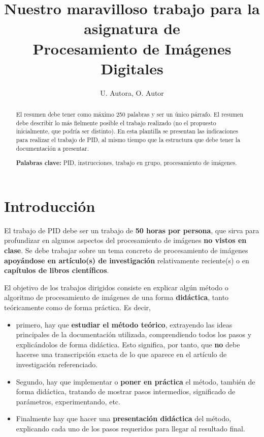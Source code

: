 \documentclass[a4paper]{article}
\title{Nuestro maravilloso trabajo para la asignatura de\\
Procesamiento de Imágenes Digitales}
\author{U. Autora, O. Autor}
\begin{document}
\maketitle

\begin{abstract}
 \noindent El resumen debe tener como máximo 250 palabras y ser un único párrafo. El resumen debe describir lo más fielmente posible el trabajo realizado (no el propuesto inicialmente, que podría ser distinto). 
 En esta plantilla se presentan las indicaciones para realizar el trabajo de PID, al mismo tiempo que la estructura que debe tener la documentación a presentar. 

\hspace{1cm}

\noindent \textbf{Palabras clave:} 
PID, instrucciones, trabajo en grupo, procesamiento de imágenes.
\end{abstract}


\section{Introducción}

El trabajo de PID debe ser un trabajo de {\bf 50 horas por persona}, que sirva para profundizar en algunos aspectos del procesamiento de imágenes {\bf no vistos en clase}. Se debe trabajar sobre un tema concreto de procesamiento de imágenes {\bf apoyándose en artículo(s) de investigación} relativamente reciente(s) o en {\bf capítulos de libros científicos}.

El objetivo de los trabajos dirigidos consiste en explicar algún método o algoritmo de procesamiento de imágenes de una forma {\bf didáctica}, tanto teóricamente como de forma práctica. Es decir, 
\begin{itemize}
    \item primero, hay que {\bf estudiar el método teórico}, extrayendo las ideas principales de la documentación utilizada, comprendiendo todos los pasos y explicándolos de forma didáctica. Esto significa, por tanto, que {\bf no} debe hacerse una transcripción exacta de lo que aparece en el artículo de investigación referenciado.
    \item Segundo, hay que implementar o {\bf poner en práctica} el método, también de forma didáctica, tratando de mostrar pasos intermedios, significado de parámetros, experimentando, etc.
    \item Finalmente hay que hacer una {\bf presentación didáctica} del método,  explicando cada uno de los pasos requeridos para llegar al resultado final.

\end{itemize}
\end{document}
